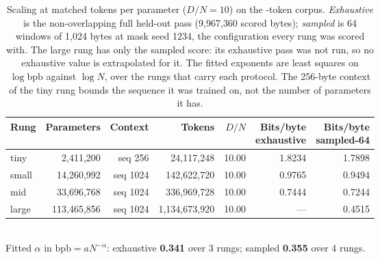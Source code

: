 \begin{table}[htbp]
\centering
\footnotesize
\caption{Scaling at matched tokens per parameter ($D/N = 10$) on the
\CorpusTokens-token corpus. \emph{Exhaustive} is the non-overlapping full
held-out pass (9{,}967{,}360 scored bytes); \emph{sampled} is 64 windows of
1{,}024 bytes at mask seed 1234, the configuration every rung was scored with.
The large rung has only the sampled score: its exhaustive pass was not run, so
no exhaustive value is extrapolated for it. The fitted exponents are least
squares on $\log \mathrm{bpb}$ against $\log N$, over the rungs that carry each
protocol. The 256-byte context of the tiny rung bounds the sequence it was
trained on, not the number of parameters it has.}
\label{tab:iso-dn}
\begin{tabular}{lrrrrrr}
\toprule
Rung & Parameters & Context & Tokens & $D/N$ & \shortstack{Bits/byte\\exhaustive} & \shortstack{Bits/byte\\sampled-64} \\
\midrule
tiny & 2{,}411{,}200 & seq 256 & 24{,}117{,}248 & 10.00 & 1.8234 & 1.7898 \\
small & 14{,}260{,}992 & seq 1024 & 142{,}622{,}720 & 10.00 & 0.9765 & 0.9494 \\
mid & 33{,}696{,}768 & seq 1024 & 336{,}969{,}728 & 10.00 & 0.7444 & 0.7244 \\
large & 113{,}465{,}856 & seq 1024 & 1{,}134{,}673{,}920 & 10.00 & --- & 0.4515 \\
\bottomrule
\end{tabular}
\\[0.5em]
Fitted $\alpha$ in $\mathrm{bpb} = aN^{-\alpha}$: exhaustive
\textbf{0.341} over 3 rungs; sampled
\textbf{0.355} over 4 rungs.
\end{table}
